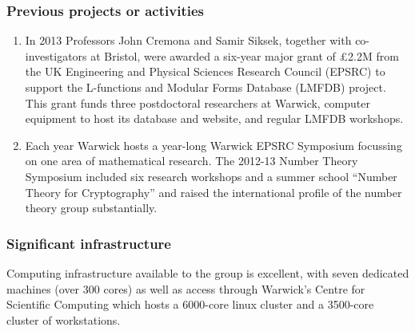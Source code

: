 \subsubsection*{Previous projects or activities}

\begin{enumerate}
\item
In 2013 Professors John Cremona and Samir Siksek, together with
co-investigators at Bristol, were awarded a six-year major grant of
£2.2M from the UK Engineering and Physical Sciences Research Council
(EPSRC) to support the L-functions and Modular Forms Database (LMFDB)
project.  This grant funds three postdoctoral researchers at Warwick,
computer equipment to host its database and website, and regular LMFDB
workshops.
\item
Each year Warwick hosts a year-long Warwick EPSRC Symposium focussing
on one area of mathematical research.  The 2012-13 Number Theory
Symposium included six research workshops and a summer school ``Number
Theory for Cryptography'' and raised the international profile of the
number theory group substantially.
\end{enumerate}

\subsubsection*{Significant infrastructure}

Computing infrastructure available to the group is excellent, with
seven dedicated machines (over 300 cores) as well as access through
Warwick's Centre for Scientific Computing which hosts a 6000-core
linux cluster and a 3500-core cluster of workstations.
